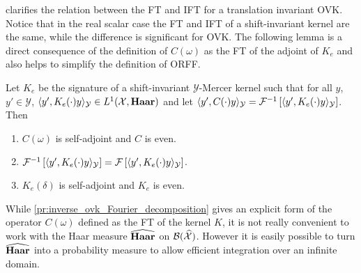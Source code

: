 \documentclass[twoside,11pt]{article}
\begin{document}
clarifies the relation between the \acl{FT} and \acl{IFT} for a translation
invariant \acl{OVK}. Notice that in the real scalar case the \acl{FT} and
\acl{IFT} of a shift-invariant kernel are the same, while the difference is
significant for \acs{OVK}.  The following lemma is a direct consequence of the
definition of $C(\omega)$ as the \acl{FT} of the adjoint of $K_e$ and also
helps to simplify the definition of \acs{ORFF}.
\begin{lemma}
    \label{lm:C_characterization}
    Let $K_e$ be the signature of a shift-invariant $\mathcal{Y}$-Mercer kernel
    such that for all $y$, $y'\in\mathcal{Y}$, $\langle y',
    K_e(\cdot)y\rangle_{\mathcal{Y}}\in L^1(\mathcal{X},\mathbf{Haar})$ and let $\langle y',
    C(\cdot)y\rangle_{\mathcal{Y}}=\mathcal{F}^{-1}\left[\langle y', K_e(\cdot)y\rangle_{\mathcal{Y}}\right]$.
    Then
    \begin{enumerate}
        \item \label{lm:C_characterization_1} $C(\omega)$ is self-adjoint and
        $C$ is even.
        \item \label{lm:C_characterization_2} $\mathcal{F}^{-1}\left[\langle y',
        K_e(\cdot)y\rangle_{\mathcal{Y}}\right] = \mathcal{F}\left[\langle y',
        K_e(\cdot)y\rangle_{\mathcal{Y}}\right]$.
        \item \label{lm:C_characterization_3} $K_e(\delta)$ is self-adjoint and
        $K_e$ is even.
    \end{enumerate}
\end{lemma}
While \cref{pr:inverse_ovk_Fourier_decomposition} gives an explicit form of the
operator $C(\omega)$ defined as the \acl{FT} of the kernel $K$, it is not
really convenient to work with the Haar measure $\widehat{\mathbf{Haar}}$ on
$\mathcal{B}(\widehat{\mathcal{X}})$. However it is easily possible to turn
$\widehat{\mathbf{Haar}}$ into a probability measure to allow efficient integration over
an infinite domain.
\end{document}
